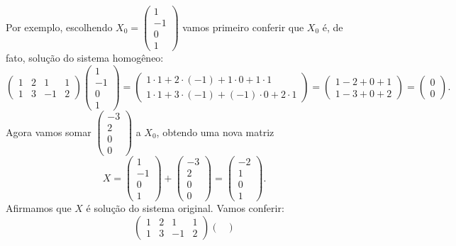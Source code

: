 \begin{ex}
	Por exemplo, escolhendo $X_0=\begin{pmatrix}
	1\\-1\\0\\1
	\end{pmatrix}$ vamos primeiro conferir que $X_0$ é, de fato, solução do sistema homogêneo:
	\[\begin{pmatrix}
		1 & 2 & 1 & 1\\1&3&-1&2
	\end{pmatrix}\begin{pmatrix}
	1\\-1\\0\\1
\end{pmatrix}=\begin{pmatrix}
1\cdot 1+2\cdot(-1)+1\cdot 0+1\cdot 1\\
1\cdot 1+3\cdot(-1)+(-1)\cdot 0+2\cdot 1
\end{pmatrix}=\begin{pmatrix}
1-2+0+1\\1-3+0+2
\end{pmatrix}=\begin{pmatrix}
0\\0
\end{pmatrix}.\] Agora vamos somar $\begin{pmatrix}
-3\\2\\0\\0
\end{pmatrix}$ a $X_0$, obtendo uma nova matriz
\[X=\begin{pmatrix}
1\\-1\\0\\1
\end{pmatrix}+\begin{pmatrix}
-3\\2\\0\\0
\end{pmatrix}=\begin{pmatrix}
-2\\1\\0\\1
\end{pmatrix}.\] Afirmamos que $X$ é solução do sistema original. Vamos conferir:
\[\begin{pmatrix}
1&2&1&1\\1&3&-1&2
\end{pmatrix}\begin{pmatrix}

\end{pmatrix}\]
\end{ex}
